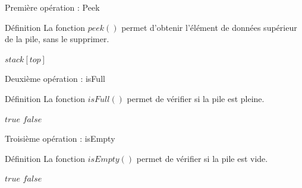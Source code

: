 \documentclass[10pt,xcolor=dvipsnames]{beamer}
\begin{document}
\begin{frame}{Première opération : Peek}
    \begin{exampleblock}{Définition}
    La fonction $peek()$ permet d'obtenir l'élément de données supérieur de la pile, sans le supprimer.
    \end{exampleblock}

    \begin{tcolorbox}

  \begin{algorithmic}[1]
       \State{} $stack[top]$
    \EndFunction
  \end{algorithmic}
 \end{tcolorbox}
\end{frame}

\begin{frame}{Deuxième opération : isFull}
    \begin{exampleblock}{Définition}
    La fonction $isFull()$ permet de vérifier si la pile est pleine.
    \end{exampleblock}

        \begin{tcolorbox}
  \begin{algorithmic}[1]
            \State{} $true$
       \Else
            \State{} $false$
       \EndIf
    \EndFunction
  \end{algorithmic}
 \end{tcolorbox}
\end{frame}

\begin{frame}{Troisième opération : isEmpty}
    \begin{exampleblock}{Définition}
    La fonction $isEmpty()$ permet de vérifier si la pile est vide.
    \end{exampleblock}
    
            \begin{tcolorbox}
  \begin{algorithmic}[1]
            \State{} $true$
       \Else
            \State{} $false$
       \EndIf
    \EndFunction
  \end{algorithmic}
 \end{tcolorbox}
\end{frame}
\end{document}
